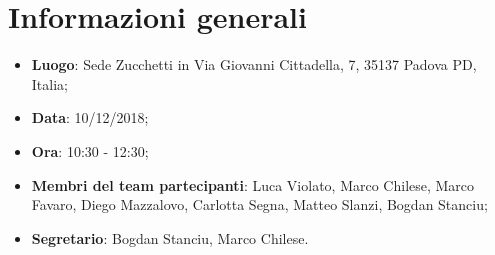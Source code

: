 \section{Informazioni generali}
\begin{itemize}
	\item \textbf{Luogo}: Sede Zucchetti in Via Giovanni Cittadella, 7, 35137 Padova PD, Italia; 
	\item \textbf{Data}: 10/12/2018; 
	\item \textbf{Ora}: 10:30 - 12:30; 
	\item \textbf{Membri del team partecipanti}: Luca Violato, Marco Chilese, Marco Favaro, 
	Diego Mazzalovo, Carlotta Segna, Matteo Slanzi, Bogdan Stanciu; 
	\item \textbf{Segretario}: Bogdan Stanciu, Marco Chilese. 
\end{itemize}






